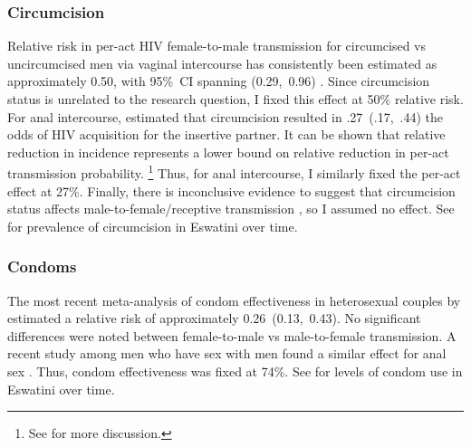 \subsubsection{Circumcision}\label{model.par.beta.circ}
Relative risk in per-act HIV female-to-male transmission for circumcised vs uncircumcised men
via vaginal intercourse has consistently been estimated as
approximately 0.50, with 95\%~CI spanning (0.29,~0.96) \cite{Boily2009,Hughes2012,Patel2014}.
Since circumcision status is unrelated to the research question,
I fixed this effect at 50\% relative risk.
For anal intercourse, \citet{Wiysonge2011} estimated that circumcision resulted in
.27~(.17,~.44) the odds of HIV acquisition for the insertive partner.
It can be shown that relative reduction in incidence represents a lower bound
on relative reduction in per-act transmission probability.%
\footnote{See  for more discussion.}
Thus, for anal intercourse, I similarly fixed the per-act effect at 27\%.
Finally, there is inconclusive evidence to suggest that circumcision status affects
male-to-female/receptive transmission \cite{Weiss2009,Wiysonge2011}, so I assumed no effect.
See  for prevalence of circumcision in Eswatini over time.
\subsubsection{Condoms}\label{model.par.beta.condom}
The most recent meta-analysis of condom effectiveness in heterosexual couples by \citet{Giannou2016}
estimated a relative risk of approximately 0.26~(0.13,~0.43).
No significant differences were noted between female-to-male vs male-to-female transmission.
A recent study among men who have sex with men found
a similar effect for anal sex \cite{Smith2015}.
Thus, condom effectiveness was fixed at 74\%.
See  for levels of condom use in Eswatini over time.
